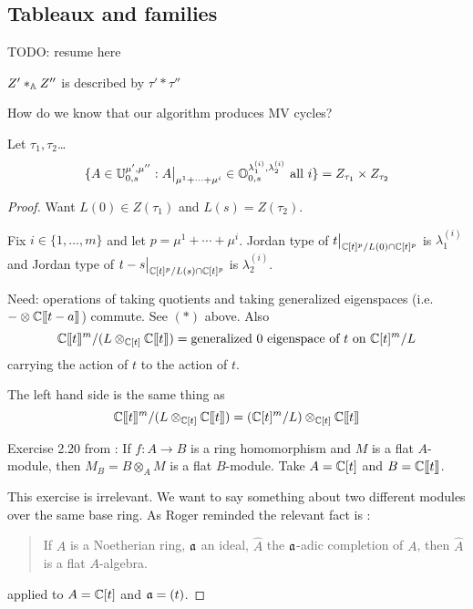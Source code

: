 \documentclass[draft]{article}
\begin{document}
\subsection{Tableaux and families}
% 
TODO: resume here 

$Z'\ast_\AA Z''$ is described by $\tau'\ast\tau''$

\begin{question}
    How do we know that our algorithm produces MV cycles? 
\end{question}

\begin{proposition}
    Let $\tau_1,\tau_2$\dots 
    \[
    \{A\in\UU_{0,s}^{\mu',\mu''} : A \big|_{\mu^1 + \cdots + \mu^i} \in \OO_{0,s}^{\lambda_{1}^{(i)},\lambda_2^{(i)}} \text{ all } i\} = Z_{\tau_1}\times Z_{\tau_2}
    \]
\end{proposition}

\begin{proof}
    Want $L(0) \in Z(\tau_1)$ and $L(s) = Z(\tau_2)$. 

    Fix $i \in \{1,\dots,m\}$ and let $p = \mu^1 + \cdots + \mu^i$. 
    Jordan type of $t\big|_{\CC[t]^p/L(0)\cap\CC[t]^p}$ is $\lambda_1^{(i)}$ and Jordan type of $t-s\big|_{\CC[t]^p/L(s)\cap \CC[t]^p}$ is $\lambda_2^{(i)}$. 

    Need: operations of taking quotients and taking generalized eigenspaces (i.e.\ $-\otimes\CC\xt[t-a]$) commute.
    See $(*)$ above. Also 
    $$\CC\xt^m/(L \otimes_{\CC[t]} \CC\xt) = \text{generalized $0$ eigenspace of $t$ on } \CC[t]^m/L$$
    carrying the action of $t $ to the action of $t$.
    
    The left hand side is the same thing as
    $$ \CC\xt^m / (L \otimes_{\CC[t]} \CC\xt) = (\CC[t]^m/L) \otimes_{\CC[t]} \CC\xt $$

    Exercise 2.20 from \cite{atiyah2018introduction}: If $f : A \to B$ is a ring homomorphism and $M$ is a flat $A$-module, then $M_B = B\otimes_A M$ is a flat $B$-module. Take $A=\CC[t]$ and $B=\CC\xt$. \marginpar[]{*}

    This exercise is irrelevant. We want to say something about two different modules over the same base ring. As Roger reminded the relevant fact is \cite[Proposition~10.14]{atiyah2018introduction}: 
    \begin{quotation}
        If $A$ is a Noetherian ring, $\fa$ an ideal, $\hat A$ the $\fa$-adic completion of $A$, then $\hat A$ is a flat $A$-algebra.
    \end{quotation}
    applied to $A = \CC[t]$ and $\fa = (t)$. 
\end{proof}
\end{document}
